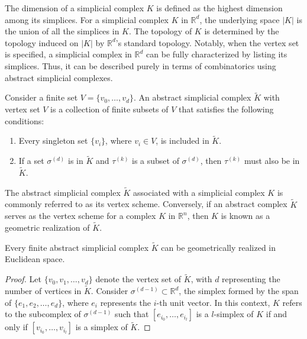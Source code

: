 The dimension of a simplicial complex $K$ is defined as the highest dimension among
its simplices. For a simplicial complex $K$ in $\mathbb{R}^{d}$, the underlying space
$\vert K \vert$ is the union of all the simplices in $K$. The topology of $K$ is
determined by the topology induced on $\vert K \vert$ by $\mathbb{R}^{d}$'s
standard topology. Notably, when the vertex set is specified, a simplicial complex
in $\mathbb{R}^{d}$ can be fully characterized by listing its simplices. Thus, it
can be described purely in terms of combinatorics using abstract simplicial complexes.

\begin{definition}
	{\cite[\S 2.3]{boissonnat2018geometric}} \label{abstractsimplicialcomplex}
	Consider a finite set $V = \{v_{0}, \ldots, v_{d}\}$. An abstract simplicial
	complex $\tilde{K}$ with vertex set $V$ is a
	collection of finite subsets of $V$ that satisfies the following conditions:
	\begin{enumerate}
		\item Every singleton set $\{v_{i}\}$, where $v_{i} \in V$, is included in $\tilde
			{K}$.

		\item If a set $\sigma^{(d)}$ is in $\tilde{K}$ and $\tau^{(k)}$ is a subset
			of $\sigma^{(d)}$, then $\tau^{(k)}$ must also be in $\tilde{K}$.
	\end{enumerate}
\end{definition}

The abstract simplicial complex $\tilde{K}$ associated with a simplicial complex
$K$ is commonly referred to as its vertex scheme.
Conversely, if an abstract complex $\tilde{K}$ serves as the vertex scheme for a
complex $K$ in $\mathbb{R}^{n}$, then $K$ is known as a geometric realization of $\tilde{K}$.

\begin{proposition}
	Every finite abstract simplicial complex $\tilde{K}$ can be geometrically realized
	in Euclidean space.
\end{proposition}

\begin{proof}
	Let $\{v_{0}, v_{1}, \ldots, v_{d}\}$ denote the vertex set of $\tilde{K}$,
	with $d$ representing the number of vertices in $\tilde{K}$. Consider $\sigma^{(d-1)}
	\subset \mathbb{R}^{d}$, the simplex formed by the span of
	$\{e_{1}, e_{2}, \ldots, e_{d}\}$, where $e_{i}$ represents the $i$-th unit vector.
	In this context, $K$ refers to the subcomplex of $\sigma^{(d-1)}$ such that $[e
	_{i_0}, \ldots, e_{i_l}]$ is a $l$-simplex of $K$ if and only if $[v_{i_0}, \ldots
	, v_{i_l}]$ is a simplex of $\tilde{K}$.
\end{proof}

